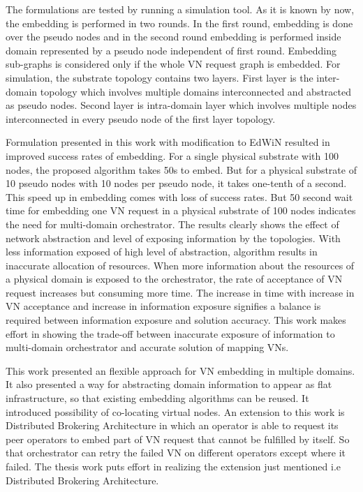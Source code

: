 \documentclass[article,dr=phil,type=msc ,colorback,accentcolor=tud4b]{tudthesis}
\begin{document}
The formulations are tested by running a simulation tool. As it is known by now, the embedding is performed in two rounds. In the first round, embedding is done over the pseudo nodes and in the second round embedding is performed inside domain represented by a pseudo node independent of first round. Embedding sub-graphs is considered only if the whole VN request graph is embedded. For simulation, the substrate topology contains two layers. First layer is the inter-domain topology which involves multiple domains interconnected and abstracted as pseudo nodes. Second layer is intra-domain layer which involves multiple nodes interconnected in every pseudo node of the first layer topology. 

\hspace*{1cm}Formulation presented in this work with modification to EdWiN resulted in improved success rates of embedding. For a single physical substrate with 100 nodes, the proposed algorithm takes 50s to embed. But for a physical substrate of 10 pseudo nodes with 10 nodes per pseudo node, it takes one-tenth of a second. This speed up in embedding comes with loss of success rates. But 50 second wait time for embedding one VN request in a physical substrate of 100 nodes indicates the need for multi-domain orchestrator. The results clearly shows the effect of network abstraction and level of exposing information by the topologies. With less information exposed of high level of abstraction, algorithm results in inaccurate allocation of resources. When more information about the resources of a physical domain is exposed to the orchestrator, the rate of acceptance of VN request increases but consuming more time. The increase in time with increase in VN acceptance and increase in information exposure signifies a balance is required between information exposure and solution accuracy. This work makes effort in showing the trade-off between inaccurate exposure of information to multi-domain orchestrator and accurate solution of mapping VNs. \newline

This work presented an flexible approach for VN embedding in multiple domains. It also presented a way for abstracting domain information to appear as flat infrastructure, so that existing embedding algorithms can be reused. It introduced possibility of co-locating virtual nodes. An extension to this work is Distributed Brokering Architecture in which an operator is able to request its peer operators to embed part of VN request that cannot be fulfilled by itself. So that orchestrator can retry the failed VN on different operators except where it failed. The thesis work puts effort in realizing the extension just mentioned i.e Distributed Brokering Architecture. 
\end{document}
